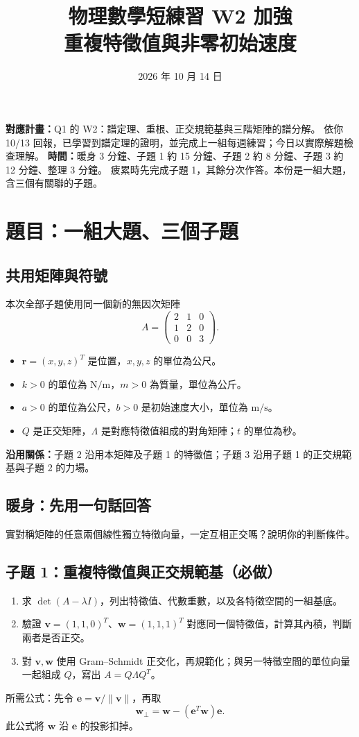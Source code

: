 \documentclass[12pt,a4paper]{article}
\title{物理數學短練習 W2 加強\protect\\重複特徵值與非零初始速度}
\author{}
\date{2026 年 10 月 14 日}
\begin{document}
\maketitle
\vspace{-1.2em}
\textbf{對應計畫：}Q1 的 W2：譜定理、重根、正交規範基與三階矩陣的譜分解。
依你 10/13 回報，已學習到譜定理的證明，並完成上一組每週練習；今日以實際解題檢查理解。
\textbf{時間：}暖身 3 分鐘、子題 1 約 15 分鐘、子題 2 約 8 分鐘、子題 3 約 12 分鐘、整理 3 分鐘。
疲累時先完成子題 1，其餘分次作答。本份是一組大題，含三個有關聯的子題。

\section{題目：一組大題、三個子題}
\subsection*{共用矩陣與符號}
本次全部子題使用同一個新的無因次矩陣
\[
  A=\begin{pmatrix}2&1&0\\1&2&0\\0&0&3\end{pmatrix}.
\]
\begin{itemize}
  \item \(\mathbf r=(x,y,z)^T\) 是位置，\(x,y,z\) 的單位為公尺。
  \item \(k>0\) 的單位為 \(\mathrm{N/m}\)，\(m>0\) 為質量，單位為公斤。
  \item \(a>0\) 的單位為公尺，\(b>0\) 是初始速度大小，單位為 \(\mathrm{m/s}\)。
  \item \(Q\) 是正交矩陣，\(\Lambda\) 是對應特徵值組成的對角矩陣；\(t\) 的單位為秒。
\end{itemize}
\textbf{沿用關係：}子題 2 沿用本矩陣及子題 1 的特徵值；子題 3 沿用子題 1 的正交規範基與子題 2 的力場。

\subsection*{暖身：先用一句話回答}
實對稱矩陣的任意兩個線性獨立特徵向量，一定互相正交嗎？說明你的判斷條件。

\subsection*{子題 1：重複特徵值與正交規範基（必做）}
\begin{enumerate}
  \item 求 \(\det(A-\lambda I)\)，列出特徵值、代數重數，以及各特徵空間的一組基底。
  \item 驗證 \(\mathbf v=(1,1,0)^T\)、\(\mathbf w=(1,1,1)^T\) 對應同一個特徵值，計算其內積，判斷兩者是否正交。
  \item 對 \(\mathbf v,\mathbf w\) 使用 Gram--Schmidt 正交化，再規範化；與另一特徵空間的單位向量一起組成 \(Q\)，寫出 \(A=Q\Lambda Q^T\)。
\end{enumerate}
所需公式：先令 \(\mathbf e=\mathbf v/\|\mathbf v\|\)，再取
\[
  \mathbf w_\perp=\mathbf w-(\mathbf e^T\mathbf w)\mathbf e.
\]
此公式將 \(\mathbf w\) 沿 \(\mathbf e\) 的投影扣掉。
\end{document}
